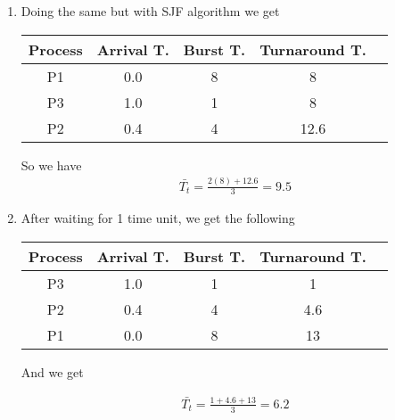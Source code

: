 \documentclass{article}
\begin{document}
\begin{enumerate}[label=(\alph*)]
	\item Doing the same but with SJF algorithm we get
	      \begin{center}
		      \begin{tabular}{|c|c|c|c|c|}
			      \hline
			      Process & Arrival T. & Burst T. & Turnaround T. \\
			      \hline
			      P1      & 0.0        & 8        & 8             \\
			      \hline
			      P3      & 1.0        & 1        & 8             \\
			      \hline
			      P2      & 0.4        & 4        & 12.6          \\
			      \hline
		      \end{tabular}
	      \end{center}
	      So we have
	      \begin{align*}
		      \bar{T_{t}} = \frac{2(8)+ 12.6}{3} = 9.5
	      \end{align*}
	\item After waiting for 1 time unit, we get the following
	      \begin{center}
		      \begin{tabular}{|c|c|c|c|c|}
			      \hline
			      Process & Arrival T. & Burst T. & Turnaround T. \\
			      \hline
			      P3      & 1.0        & 1        & 1             \\
			      \hline
			      P2      & 0.4        & 4        & 4.6           \\
			      \hline
			      P1      & 0.0        & 8        & 13            \\
			      \hline
		      \end{tabular}
	      \end{center}
	      And we get

	      \begin{align*}
		      \bar{T_{t}} = \frac{1 + 4.6 + 13}{3} = 6.2
	      \end{align*}
\end{enumerate}
\end{document}
